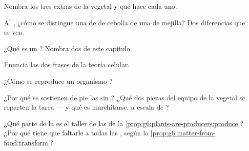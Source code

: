 \begin{exercise}[$\star$]\label{exo:g6:cell-unit-of-life:2}
Nombra los tres extras de la  vegetal y qué hace cada uno.
\end{exercise}

\begin{exercise}[$\star$]\label{exo:g6:cell-unit-of-life:3}
Al , ¿cómo se distingue una  de  de cebolla de una
 de mejilla? Dos diferencias que se ven.
\end{exercise}

\begin{exercise}[$\star$]\label{exo:g6:cell-unit-of-life:4}
¿Qué es un  ? Nombra dos de este capítulo.
\end{exercise}

\begin{exercise}[$\star$]\label{exo:g6:cell-unit-of-life:5}
Enuncia las dos frases de la teoría celular.
\end{exercise}

\begin{exercise}[$\star$]\label{exo:g6:cell-unit-of-life:6}
¿Cómo se reproduce un organismo ?
\end{exercise}

\begin{exercise}[$\star\star$]\label{exo:g6:cell-unit-of-life:7}
¿Por qué se sostienen de pie las  sin ? ¿Qué dos piezas
del equipo de la  vegetal se reparten la tarea --- y qué es
marchitarse, a escala de ?
\end{exercise}

\begin{exercise}[$\star\star$]\label{exo:g6:cell-unit-of-life:8}
¿Qué parte de la  es el taller de las  de la
\cref{prop:g6:plants-are-producers:produce}? ¿Por qué tiene que
faltarle a todas las  , según la
\cref{prop:g6:matter-from-food:transform}?
\end{exercise}

